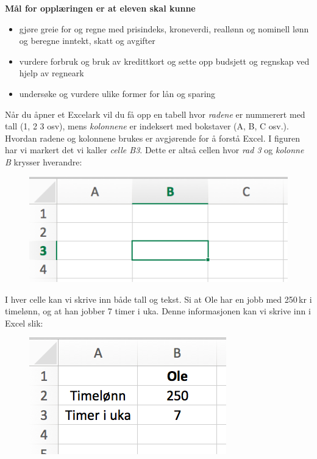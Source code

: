 




\textbf{Mål for opplæringen er at eleven skal kunne}
\begin{itemize}
	\item gjøre greie for og regne med prisindeks, kroneverdi, reallønn og nominell lønn og beregne inntekt, skatt og avgifter
	\item vurdere forbruk og bruk av kredittkort og sette opp budsjett og regnskap ved hjelp av regneark
	\item undersøke og vurdere ulike former for lån og sparing
\end{itemize}
\newpage
{}
Når du åpner et Excelark vil du få opp en tabell hvor \textit{radene} er nummerert med tall (1, 2 3 osv), mens \textit{kolonnene} er indeksert med bokstaver (A, B, C osv.).\vsk
Hvordan radene og kolonnene brukes er avgjørende for å forstå Excel. I figuren har vi markert det vi kaller \textit{celle B\textsl{3}}. Dette er altså cellen hvor \textsl{rad 3} og \textsl{kolonne B} krysser hverandre:
\begin{figure}[H]
	\centering
	\includegraphics[scale=0.3]{figs/ex1}
\end{figure}
I hver celle kan vi skrive inn både tall og tekst. Si at Ole har en jobb med 250\,kr i timelønn, og at han jobber 7 timer i uka. Denne informasjonen kan vi skrive inn i Excel slik:
\begin{figure}[H]
	\centering
	\includegraphics[scale=0.35]{figs/ex2}
\end{figure}
